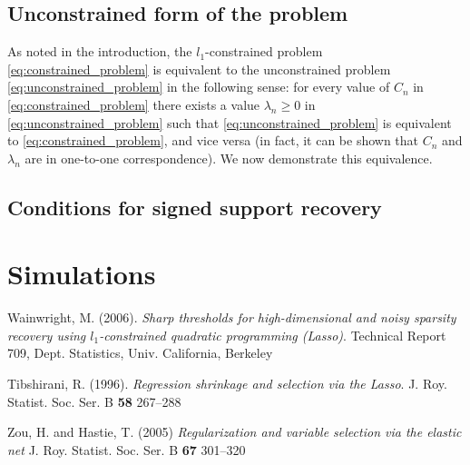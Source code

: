 \documentclass[letterpaper,12pt]{article}
\begin{document}
\subsection*{Unconstrained form of the problem}

As noted in the introduction, the $l_1$-constrained problem
\eqref{eq:constrained_problem} is equivalent to the unconstrained
problem \eqref{eq:unconstrained_problem} in the following sense: for
every value of $C_n$ in \eqref{eq:constrained_problem} there exists a
value $\lambda_n \geq 0$ in \eqref{eq:unconstrained_problem} such that
\eqref{eq:unconstrained_problem} is equivalent to
\eqref{eq:constrained_problem}, and vice versa (in fact, it can be
shown that $C_n$ and $\lambda_n$ are in one-to-one correspondence). We
now demonstrate this equivalence.

\subsection*{Conditions for signed support recovery}

\section*{Simulations}

\begin{thebibliography}{9}
  Wainwright, M. (2006).
  \textit{Sharp thresholds for high-dimensional and noisy sparsity
    recovery using $l_1$-constrained quadratic programming (Lasso)}.
  Technical Report 709, Dept. Statistics, Univ. California,
  Berkeley

  Tibshirani, R. (1996).
  \textit{Regression shrinkage and selection via the Lasso}.
  J. Roy. Statist. Soc. Ser. B \textbf{58} 267--288

  Zou, H. and Hastie, T. (2005)
  \textit{Regularization and variable selection via the elastic net}
  J. Roy. Statist. Soc. Ser. B \textbf{67} 301--320

\end{thebibliography}
\end{document}
